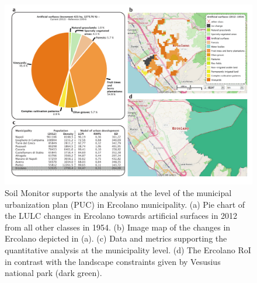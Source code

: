 \documentclass[APA,LATO1COL,doublespace]{WileyNJD-v2}
\begin{document}
\begin{figure}[t] %
    \centerline{\includegraphics[width=450pt]{daMileti/07_caso_comunale.pdf}}
    \caption{ Soil Monitor supports the analysis at the level of the municipal urbanization plan (PUC) in Ercolano municipality.
              (a) Pie chart of the LULC changes in Ercolano towards artificial surfaces in 2012 from all other classes in 1954.
              (b) Image map of the changes in Ercolano depicted in (a).
              (c) Data and metrics supporting the quantitative analysis at the municipality level.
              (d) The Ercolano RoI in contrast with the landscape constraints given by Vesusius national park (dark green). }
    \label{fig:caseCOM_Ercolano}
\end{figure}
\end{document}

